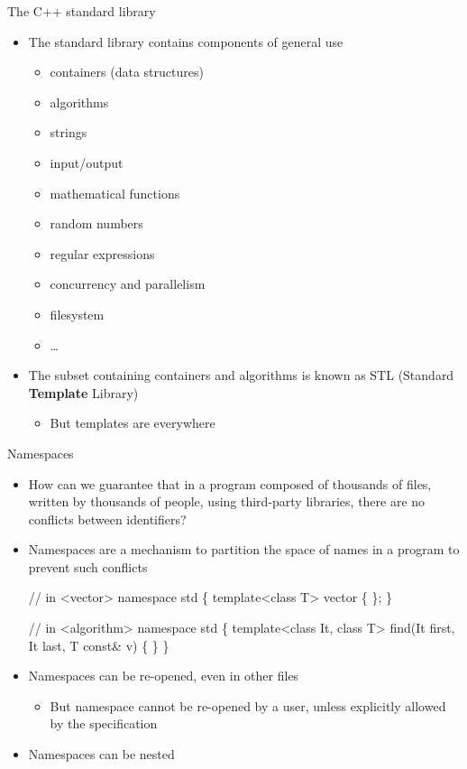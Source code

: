 \begin{frame}{The C++ standard library}

  \begin{itemize}
  \item The standard library contains components of general use
    \begin{itemize}
    \item \alert<2>{containers (data structures)}
    \item \alert<2>{algorithms}
    \item strings
    \item input/output
    \item mathematical functions
    \item random numbers
    \item regular expressions
    \item concurrency and parallelism
    \item filesystem
    \item \ldots
    \end{itemize}

  \item The subset containing containers and algorithms is known as STL
    (Standard \alert{\textbf{Template}} Library)
    \begin{itemize}
    \item But templates are everywhere
    \end{itemize}
  \end{itemize}

\end{frame}

\begin{frame}[fragile]{Namespaces}

  \begin{itemize}
  \item How can we guarantee that in a program composed of thousands of files,
    written by thousands of people, using third-party libraries, there are no
    conflicts between identifiers?
  \item Namespaces are a mechanism to partition the space of names in a program
    to prevent such conflicts

    \begin{codeblock}
// in <vector>
\alert{namespace std \{}
  template<class T> vector \{ \ddd \};
\alert{\}}

// in <algorithm>
\alert{namespace std \{}
  template<class It, class T> find(It first, It last, T const& v) \{ \ddd \}
\alert{\}}\end{codeblock}

  \item Namespaces can be re-opened, even in other files
  \begin{itemize}
  \item But namespace  cannot be re-opened by a user, unless
    explicitly allowed by the specification
  \end{itemize}
  \item Namespaces can be nested
  \end{itemize}

\end{frame}

